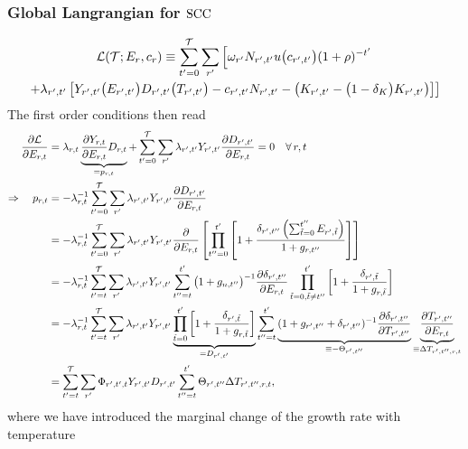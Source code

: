 \documentclass[preprint,3p,authoryear]{elsarticle}
\begin{document}
\subsubsection{Global Langrangian for $\operatorname{SCC}$}
\label{sec:Lglob}
\begin{multline}
  \label{eq:Lglob} \mathcal{L}(\mathcal{T};E_r,c_r)\equiv\sum_{t'=0}^{\mathcal{T}}\sum_{r'}\left[\omega_{r'}N_{r',t'}u\big(c_{r',t'}\big)(1+\rho)^{-t'}\right.\\
  \left.+\lambda_{r',t'}\left[Y_{r',t'}\big(E_{r',t'}\big)D_{r',t'}\big(T_{r',t'}\big) -c_{r',t'}N_{r',t'}-\left(K_{r',t'}-\big(1-\delta_K\big)K_{r',t'}\right) \right]\right]
\end{multline}
The first order conditions then read
\begin{align}
  \label{eq:partE}
  \frac{\partial\mathcal{L}}{\partial E_{r,t}} &= \lambda_{r,t}\underbrace{\frac{\partial Y_{r,t}}{\partial E_{r,t}}D_{r,t}}_{=p_{r,t}}+\sum_{t'=0}^{\mathcal{T}}\sum_{r'}\lambda_{r',t'}Y_{r',t'}\frac{\partial D_{r',t'}}{\partial E_{r,t}}=0\quad\forall\,r,t\notag\\
  \Rightarrow \quad p_{r,t} &= -\lambda_{r,t}^{-1}\sum_{t'=0}^{\mathcal{T}}\sum_{r'}\lambda_{r',t'}Y_{r',t'}\frac{\partial D_{r',t'}}{\partial E_{r,t}}\notag\\
                                              &= -\lambda_{r,t}^{-1}\sum_{t'=0}^{\mathcal{T}}\sum_{r'}\lambda_{r',t'}Y_{r',t'}\frac{\partial }{\partial E_{r,t}}\left[\prod_{t''=0}^{t'}\left[1+\frac{\delta_{r',t''}\left(\sum_{\tilde{t}=0}^{t''}E_{r',\tilde{t}}\right)}{1+g_{r,t''}} \right] \right]\notag\\
                                         &=-\lambda_{r,t}^{-1}\sum_{t'=t}^{\mathcal{T}}\sum_{r'}\lambda_{r',t'}Y_{r',t'} \sum_{t''=t}^{t'}\big(1+g_{n,t''}\big)^{-1}\frac{\partial\delta_{r',t''}}{\partial E_{r,t}}\prod_{\tilde{t}=0,\tilde{t}\neq t''}^{t'}\left[1+\frac{\delta_{r',\tilde{t}}}{1+g_{r,\tilde{t}}} \right]\notag\\
                                         &=-\lambda_{r,t}^{-1}\sum_{t'=t}^{\mathcal{T}}\sum_{r'}\lambda_{r',t'}Y_{r',t'}\underbrace{\prod_{\tilde{t}=0}^{t'}\left[1+\frac{\delta_{r',\tilde{t}}}{1+g_{r,\tilde{t}}}\right]}_{=D_{r',t'}}\sum_{t''=t}^{t'}\underbrace{(1+g_{r',t''}+\delta_{r',t''})^{-1}\frac{\partial\delta_{r',t''}}{\partial T_{r',t''}}}_{\equiv -\Theta_{r',t''}}\underbrace{\frac{\partial T_{r',t''}}{\partial E_{r,t}}}_{\equiv\Delta T_{r',t'',r,t}}\notag\\
&= \sum_{t'=t}^{\mathcal{T}}\sum_{r'}\Phi_{r',t',t}Y_{r',t'}D_{r',t'}\sum_{t''=t}^{t'}\Theta_{r',t''}\Delta T_{r',t'',r,t},  
\end{align}
where we have introduced the marginal change of the growth rate with temperature
\end{document}
